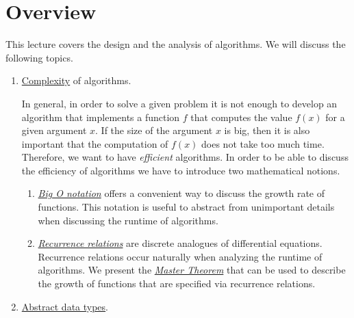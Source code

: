 \section{Overview}
This lecture covers the design and the analysis of algorithms.  We will discuss the following topics.
\begin{enumerate}

\item \href{http://en.wikipedia.org/wiki/Computational_complexity_theory}{Complexity} of algorithms.

      In general, in order to solve a given problem it is not enough to develop an algorithm that
      implements a function $f$ that computes the  value $f(x)$ for a given argument $x$.  If the size of
      the argument $x$ is big, then it is also important  
      that the computation of $f(x)$ does not take too much time.  Therefore, we want to have
      \emph{efficient} algorithms.
      In order to be able to discuss the efficiency of algorithms we have to introduce two 
      mathematical notions.
      \begin{enumerate}
      \item \href{http://en.wikipedia.org/wiki/Big_Oh}{\emph{Big O notation}} offers a convenient way to
            discuss the growth rate of functions.  This notation is useful to abstract from
            unimportant details when discussing the runtime of algorithms.  
      \item \href{http://en.wikipedia.org/wiki/Recurrence_relation}{\emph{Recurrence relations}}
            are discrete analogues of differential equations.  Recurrence relations occur naturally
            when analyzing the runtime of algorithms.  We present the 
            \href{https://en.wikipedia.org/wiki/Master_theorem}{\emph{Master Theorem}} that can be
            used to describe the growth of functions that are specified via recurrence relations.
      \end{enumerate}
\item \href{http://en.wikipedia.org/wiki/Abstract_data_types}{Abstract data types}.


\end{enumerate}
